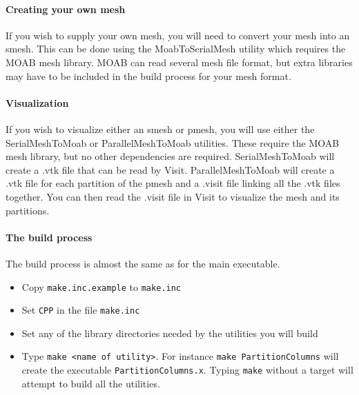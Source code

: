 \documentclass[12pt,letterpaper]{article}
\begin{document}
\paragraph{Creating your own mesh}
If you wish to supply your own mesh, you will need to convert your mesh into an smesh.
This can be done using the MoabToSerialMesh utility which requires the MOAB mesh library.
MOAB can read several mesh file format, but extra libraries may have to be included in the build process for your mesh format.

\paragraph{Visualization}
If you wish to visualize either an smesh or pmesh, you will use either the SerialMeshToMoab or ParallelMeshToMoab utilities.
These require the MOAB mesh library, but no other dependencies are required.
SerialMeshToMoab will create a .vtk file that can be read by Visit.
ParallelMeshToMoab will create a .vtk file for each partition of the pmesh and a .visit file linking all the .vtk files together.
You can then read the .visit file in Visit to visualize the mesh and its partitions.

\paragraph{The build process}
The build process is almost the same as for the main executable.
\begin{itemize}
\item Copy {\tt make.inc.example} to {\tt make.inc}
\item Set {\tt CPP} in the file {\tt make.inc}
\item Set any of the library directories needed by the utilities you will build
\item Type {\tt make <name of utility>}.  For instance {\tt make PartitionColumns} will create the executable {\tt PartitionColumns.x}.  Typing {\tt make} without a target will attempt to build all the utilities.
\end{itemize}
\end{document}

